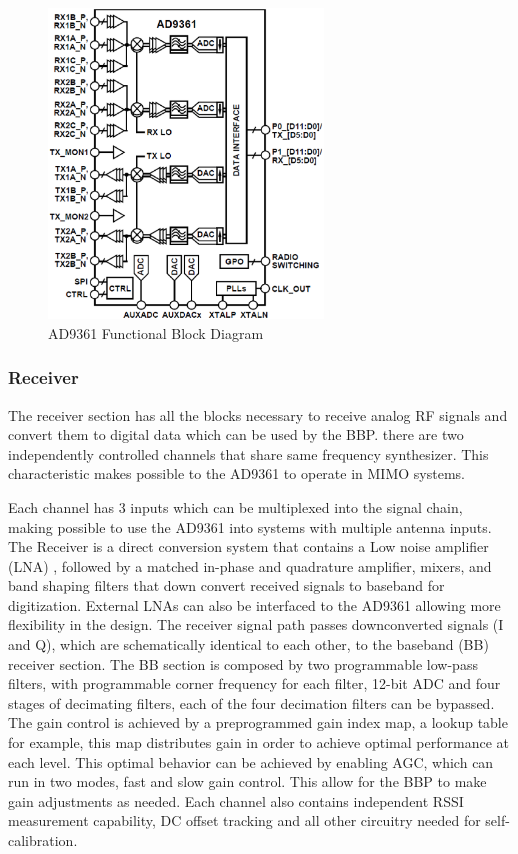 \begin{figure}[htbp]
    \centering
    \includegraphics[width=0.65\textwidth]{./figures/ad9361_functional_diagram}
    \caption{ AD9361 Functional Block Diagram
    \label{fig:ad9361func}}
\end{figure}

\subsubsection{Receiver}

The receiver section has all the blocks necessary to receive analog RF signals and convert them to digital data which can be used by the BBP. there are two independently controlled channels that share same frequency synthesizer. This characteristic makes possible to the AD9361 to operate in MIMO systems.

Each channel has 3 inputs which can be multiplexed into the signal chain, making possible to use the AD9361 into systems with multiple antenna inputs. The Receiver is a direct conversion system that contains a Low noise amplifier (LNA) , followed by a matched in-phase and quadrature amplifier, mixers, and band shaping filters that down convert received signals to baseband for digitization. External LNAs can also be interfaced to the AD9361 allowing more flexibility in the design.
The receiver signal path passes downconverted signals (I and Q), which are schematically identical to each other,  to the baseband (BB) receiver section. The BB section is composed by two programmable low-pass filters, with programmable corner frequency for each filter, 12-bit ADC and four stages of decimating filters, each of the four decimation filters can be bypassed.
The gain control is achieved by a preprogrammed gain index map, a lookup table for example, this map distributes gain in order to achieve optimal performance at each level. This optimal behavior can be achieved by enabling AGC, which can run in two modes, fast and slow gain control. This allow for the BBP to make gain adjustments as needed.
Each channel also contains independent RSSI measurement capability, DC offset tracking and all other circuitry needed for self-calibration.

